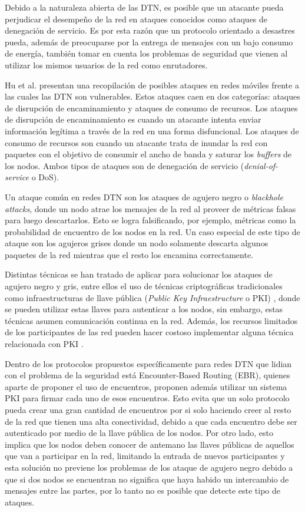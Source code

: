 Debido a la naturaleza abierta de las DTN, es posible que un atacante pueda
perjudicar el desempeño de la red en ataques conocidos como ataques de
denegación de servicio. Es por esta razón que un protocolo orientado a desastres
pueda, además de preocuparse por la entrega de mensajes con un bajo consumo de
energía, también tomar en cuenta los problemas de seguridad que vienen al
utilizar los mismos usuarios de la red como enrutadores.


Hu et al. \cite{DBLP:journals/ieeesp/HuP04} presentan una recopilación de
posibles ataques en redes móviles frente a las cuales las DTN son vulnerables.
Estos ataques caen en dos categorías: ataques de disrupción de encaminamiento y
ataques de consumo de recursos. Los ataques de disrupción de encaminamiento es
cuando un atacante intenta enviar información legítima a través de la red en una
forma disfuncional. Los ataques de consumo de recursos son cuando un atacante
trata de inundar la red con paquetes con el objetivo de consumir el ancho de
banda y saturar los \textit{buffers} de los nodos. Ambos tipos de ataques son de
denegación de servicio (\textit{denial-of-service} o DoS).

Un ataque común en redes DTN son los ataques de agujero negro o
\textit{blackhole attacks}, donde un nodo atrae los mensajes de la red al
proveer de métricas falsas para luego descartarlos. Esto se logra falsificando,
por ejemplo, métricas como la probabilidad de encuentro de los nodos en la red.
Un caso especial de este tipo de ataque son los agujeros grises donde un nodo
solamente descarta algunos paquetes de la red mientras que el resto los encamina
correctamente.


Distintas técnicas se han tratado de aplicar para solucionar los ataques de
agujero negro y gris, entre ellos el uso de técnicas criptográficas
tradicionales como infraestructuras de llave pública (\textit{Public Key
Infraestructure} o PKI) \cite{pki}, donde se pueden utilizar estas llaves para
autenticar a los nodos, sin embargo, estas técnicas asumen comunicación continua
en la red. Además, los recursos limitados de los participantes de las red pueden
hacer costoso implementar alguna técnica relacionada con PKI
\cite{DBLP:conf/securecomm/KateZH07, DBLP:conf/psats/JohnsonCS12}.


Dentro de los protocolos propuestos específicamente para redes DTN que lidian
con el problema de la seguridad está Encounter-Based Routing \cite{ebr} (EBR),
quienes aparte de proponer el uso de encuentros, proponen además utilizar un
sistema PKI para firmar cada uno de esos encuentros. Esto evita que un solo
protocolo pueda crear una gran cantidad de encuentros por si solo haciendo creer
al resto de la red que tienen una alta conectividad, debido a que cada encuentro
debe ser autenticado por medio de la llave pública de los nodos. Por otro lado,
esto implica que los nodos deben conocer de antemano las llaves públicas de
aquellos que van a participar en la red, limitando la entrada de nuevos
participantes y esta solución no previene los problemas de los ataque de agujero
negro debido a que si dos nodos se encuentran no significa que haya habido un
intercambio de mensajes entre las partes, por lo tanto no es posible que
detecte este tipo de ataques.



